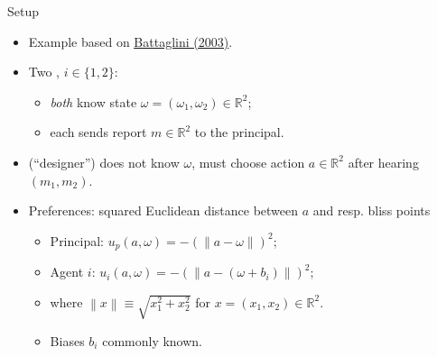 \documentclass[english,10pt
,aspectratio=169
]{beamer}
\begin{document}
\begin{frame}{Setup}
\begin{itemize}
	\item Example based on \href{https://onlinelibrary.wiley.com/doi/abs/10.1111/1468-0262.00336}{\uline{Battaglini (2003)}}.
	\item Two , $i \in \{1,2\}$:
	\begin{itemize}
		\item \emph{both} know \alert{state} $\omega = (\omega_1,\omega_2) \in \mathbb{R}^2$;
		\item each sends \alert{report} $m \in \mathbb{R}^2$ to the principal.
	\end{itemize}
	\item {} (``designer'') does not know $\omega$, must choose action $a \in \mathbb{R}^2$ after hearing $(m_1,m_2)$.
	\item Preferences: squared Euclidean distance between $a$ and resp. \alert{bliss points}
	\begin{itemize}
		\item Principal: $u_p (a,\omega) = -\left(\left\|a-\omega\right\| \right)^2$;
		\item Agent $i$: $u_i (a,\omega) = -\left(\left\|a-(\omega+b_i)\right\| \right)^2$;
		\item where $\left\|x\right\| \equiv \sqrt{x_1^2 + x_2^2}$ for $x = (x_1,x_2) \in \mathbb{R}^2$.
		\item \alert{Biases} $b_i$ commonly known.
	\end{itemize}
\end{itemize}
\end{frame}
\end{document}
